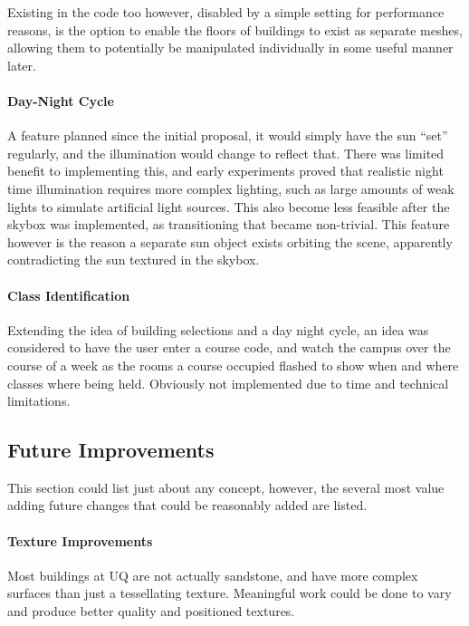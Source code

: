             Existing in the code too however, disabled by a simple setting for performance reasons, is the option to enable the floors of buildings to exist as separate meshes, allowing them to potentially be manipulated individually in some useful manner later.

        \paragraph{Day-Night Cycle} %
        \label{par:day_night_cycle}
            A feature planned since the initial proposal, it would simply have the sun ``set'' regularly, and the illumination would change to reflect that.
            There was limited benefit to implementing this, and early experiments proved that realistic night time illumination requires more complex lighting, such as large amounts of weak lights to simulate artificial light sources.
            This also become less feasible after the skybox was implemented, as transitioning that became non-trivial.
            This feature however is the reason a separate sun object exists orbiting the scene, apparently contradicting the sun textured in the skybox.

        \paragraph{Class Identification} %
        \label{par:class_identification}
            Extending the idea of building selections and a day night cycle, an idea was considered to have the user enter a course code, and watch the campus over the course of a week as the rooms a course occupied flashed to show when and where classes where being held.
            Obviously not implemented due to time and technical limitations.


    \subsection{Future Improvements} %
    \label{sub:excluded_improvements}
        This section could list just about any concept, however, the several most value adding future changes that could be reasonably added are listed.

        \paragraph{Texture Improvements} %
        \label{par:better_texturing}
            Most buildings at UQ are not actually sandstone, and have more complex surfaces than just a tessellating texture. Meaningful work could be done to vary and produce better quality and positioned textures.

